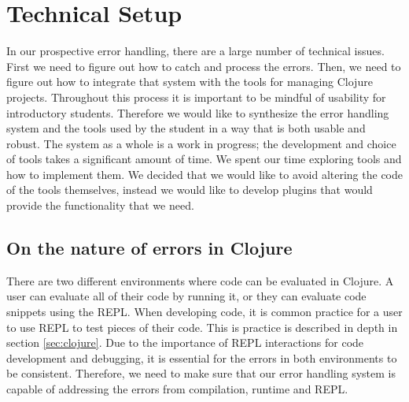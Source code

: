 \documentclass[12pt]{article}
\newcommand{\comment}[1]{{\bf \tt  {#1}}}
\newcommand{\emcomment}[1]{\textcolor{ForestGreen}{\comment{Elena: {#1}}}}
\begin{document}
\section{Technical Setup}\label{sec:technical}

In our prospective error handling, there are a large number of technical issues. First we need to figure out how to catch and process the errors. Then, we need to figure out how to integrate that system with the tools for managing Clojure projects. Throughout this process it is important to be mindful of usability for introductory students. Therefore we would like to synthesize the error handling system and the tools used by the student in a way that is both usable and robust. The system as a whole is a work in progress; the development and choice of tools takes a significant amount of time. We spent our time exploring tools and how to implement them. We decided that we would like to avoid altering the code of the tools themselves, instead we would like to develop plugins that would provide the functionality that we need. 

\subsection{On the nature of errors in Clojure}

There are two different environments where code can be evaluated in Clojure. A user can evaluate all of their code by running it, or they can evaluate code snippets using the REPL. When developing code, it is common practice for a user to use REPL to test pieces of their code. This is practice is described in depth in section \ref{sec:clojure}. Due to the importance of REPL interactions for code development and debugging, it is essential for the errors in both environments to be consistent. Therefore, we need to make sure that our error handling system is capable of addressing the errors from compilation, runtime and REPL.
\end{document}
